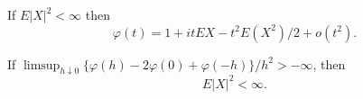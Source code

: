 \begin{theorem}{}{}
    If $E|X|^{2}<\infty$ then
    \begin{equation}
        \varphi(t)=1+itEX-t^{2}E\left(X^{2}\right)/2+o\left(t^{2}\right).
    \end{equation}
\end{theorem}

\begin{theorem}{}{}
    If $\limsup_{h\downarrow 0}\{\varphi(h)-2\varphi(0)+\varphi(-h)\}/h^{2}>-\infty$, then
    \begin{equation}
        E|X|^{2}<\infty.
    \end{equation}
\end{theorem}